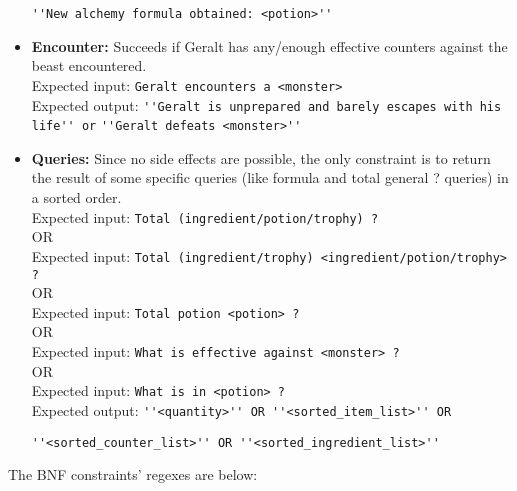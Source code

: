 \documentclass[a4paper,12pt]{article}
\begin{document}
\begin{itemize}
    \verb|''New alchemy formula obtained: <potion>''|
    \item \textbf{Encounter:} Succeeds if Geralt has any/enough effective counters against the beast encountered.\\
    Expected input: \verb|Geralt encounters a <monster>|\\
    Expected output: \verb|''Geralt is unprepared and barely escapes with his life'' or| \verb|''Geralt defeats <monster>''|
    \item \textbf{Queries:} Since no side effects are possible, the only constraint is to return the result of some specific queries (like formula and total general ? queries) in a sorted order.\\
    Expected input: \verb|Total (ingredient/potion/trophy) ?| \\
    \quad OR \\
    Expected input: \verb|Total (ingredient/trophy) <ingredient/potion/trophy> ?| \\
    \quad OR \\
    Expected input: \verb|Total potion <potion> ?| \\
    \quad OR \\
    Expected input: \verb|What is effective against <monster> ?| \\
    \quad OR \\
    Expected input: \verb|What is in <potion> ?|\\
    Expected output: \verb|''<quantity>'' OR ''<sorted_item_list>'' OR| 
    
    \verb|''<sorted_counter_list>'' OR ''<sorted_ingredient_list>''|
\end{itemize}
The BNF constraints’ regexes are below:
\end{document}
